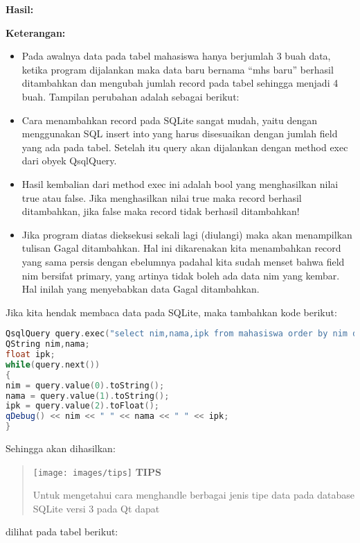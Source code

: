 \textbf{Hasil:}

\textbf{Keterangan:}

\begin{itemize}
\item
  Pada awalnya data pada tabel mahasiswa hanya berjumlah 3 buah data,
  ketika program dijalankan maka data baru bernama ``mhs baru'' berhasil
  ditambahkan dan mengubah jumlah record pada tabel sehingga menjadi 4
  buah. Tampilan perubahan adalah sebagai berikut:
\item
  Cara menambahkan record pada SQLite sangat mudah, yaitu dengan
  menggunakan SQL insert into yang harus disesuaikan dengan jumlah field
  yang ada pada tabel. Setelah itu query akan dijalankan dengan method
  exec dari obyek QsqlQuery.
\item
  Hasil kembalian dari method exec ini adalah bool yang menghasilkan
  nilai true atau false. Jika menghasilkan nilai true maka record
  berhasil ditambahkan, jika false maka record tidak berhasil
  ditambahkan!
\item
  Jika program diatas dieksekusi sekali lagi (diulangi) maka akan
  menampilkan tulisan Gagal ditambahkan. Hal ini dikarenakan kita
  menambahkan record yang sama persis dengan ebelumnya padahal kita
  sudah menset bahwa field nim bersifat primary, yang artinya tidak
  boleh ada data nim yang kembar. Hal inilah yang menyebabkan data Gagal
  ditambahkan.
\end{itemize}

Jika kita hendak membaca data pada SQLite, maka tambahkan kode berikut:

\begin{lstlisting}[language=c++, caption=Membaca data pada SQLite]
QsqlQuery query.exec("select nim,nama,ipk from mahasiswa order by nim desc");
QString nim,nama;
float ipk;
while(query.next())
{
nim = query.value(0).toString();
nama = query.value(1).toString();
ipk = query.value(2).toFloat();
qDebug() << nim << " " << nama << " " << ipk;
}
\end{lstlisting}

Sehingga akan dihasilkan:

\begin{quotation}
	\texttt{[image: images/tips]}
	\textbf{TIPS} 
	
	Untuk
	mengetahui cara menghandle berbagai jenis tipe data pada database SQLite
	versi 3 pada Qt dapat
\end{quotation}

dilihat pada tabel berikut:

